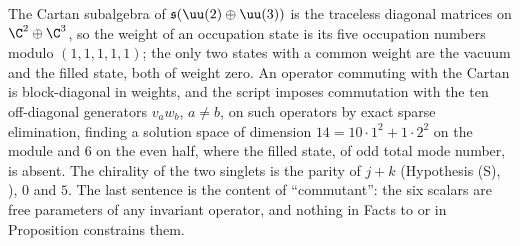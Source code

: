 The Cartan subalgebra of $\mathfrak{s}(\uu(2) \oplus \uu(3))$ is the traceless diagonal matrices on $\C^{2} \oplus \C^{3}$, so the weight of an occupation state is its five occupation numbers modulo $(1,1,1,1,1)$; the only two states with a common weight are the vacuum and the filled state, both of weight zero. An operator commuting with the Cartan is block-diagonal in weights, and the script imposes commutation with the ten off-diagonal generators $v_{a}w_{b}$, $a \ne b$, on such operators by exact sparse elimination, finding a solution space of dimension $14 = 10 \cdot 1^{2} + 1 \cdot 2^{2}$ on the module and $6$ on the even half, where the filled state, of odd total mode number, is absent. The chirality of the two singlets is the parity of $j + k$ (Hypothesis (S), ), $0$ and $5$. The last sentence is the content of ``commutant'': the six scalars are free parameters of any invariant operator, and nothing in Facts  to  or in Proposition  constrains them.
